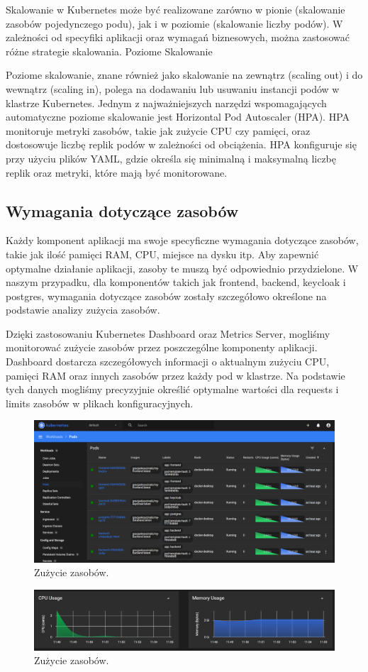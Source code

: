 \documentclass[12pt,a4paper]{article}
\begin{document}
Skalowanie w Kubernetes może być realizowane zarówno w pionie (skalowanie zasobów pojedynczego podu), jak i w poziomie (skalowanie liczby podów). W zależności od specyfiki aplikacji oraz wymagań biznesowych, można zastosować różne strategie skalowania.
Poziome Skalowanie

Poziome skalowanie, znane również jako skalowanie na zewnątrz (scaling out) i do wewnątrz (scaling in), polega na dodawaniu lub usuwaniu instancji podów w klastrze Kubernetes. Jednym z najważniejszych narzędzi wspomagających automatyczne poziome skalowanie jest Horizontal Pod Autoscaler (HPA). HPA monitoruje metryki zasobów, takie jak zużycie CPU czy pamięci, oraz dostosowuje liczbę replik podów w zależności od obciążenia.
HPA konfiguruje się przy użyciu plików YAML, gdzie określa się minimalną i maksymalną liczbę replik oraz metryki, które mają być monitorowane.

\subsection{Wymagania dotyczące zasobów}
\label{sec:ExampleTables}

Każdy komponent aplikacji ma swoje specyficzne wymagania dotyczące zasobów, takie jak ilość pamięci RAM, CPU, miejsce na dysku itp. Aby zapewnić optymalne działanie aplikacji, zasoby te muszą być odpowiednio przydzielone. W naszym przypadku, dla komponentów takich jak frontend, backend, keycloak i postgres, wymagania dotyczące zasobów zostały szczegółowo określone na podstawie analizy zużycia zasobów.

Dzięki zastosowaniu Kubernetes Dashboard oraz Metrics Server, mogliśmy monitorować zużycie zasobów przez poszczególne komponenty aplikacji. Dashboard dostarcza szczegółowych informacji o aktualnym zużyciu CPU, pamięci RAM oraz innych zasobów przez każdy pod w klastrze. Na podstawie tych danych mogliśmy precyzyjnie określić optymalne wartości dla requests i limits zasobów w plikach konfiguracyjnych.
\begin{figure}[h]
  \centering
  \includegraphics[width=15cm]{imagens/KubernetesUSAGE_1.png}
  \caption{Zużycie zasobów.}
\end{figure}
\begin{figure}[h]
  \centering
  \includegraphics[width=15cm]{imagens/KubernetesUSAGE_2.png}
  \caption{Zużycie zasobów.}
\end{figure}
\end{document}

